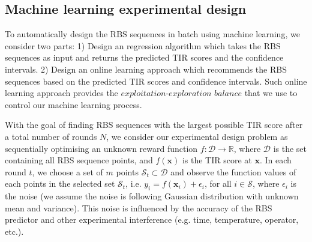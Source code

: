 \subsection{Machine learning experimental design}

To automatically design the RBS sequences in batch using machine learning, we consider two parts: 
1) Design an regression algorithm which takes the RBS sequences as input and returns the predicted TIR scores and the confidence intervals. 
2) Design an online learning approach which recommends the RBS sequences based on the predicted TIR scores and confidence intervals. 
Such online learning approach provides the $\textit{exploitation-exploration balance}$ that we use to control our machine learning process.

With the goal of finding RBS sequences with the largest possible TIR score after a total number of rounds $N$,  we consider our experimental design problem as sequentially optimising an unknown reward function $f: \mathcal{D} \rightarrow \mathbb{R}$, where $\mathcal{D}$ is the set containing all RBS sequence points, and $f(\mathbf{x})$ is the TIR score at $\mathbf{x}$. 
In each round $t$, we choose a set of $m$ points $\mathcal{S}_t \subset \mathcal{D}$ and observe the function values of each points in the selected set $\mathcal{S}_t$, i.e. $y_i = f(\mathbf{x}_i) + \epsilon_i$, for all $i \in \mathcal{S}$, where $\epsilon_i$ is the noise (we assume the noise is following Gaussian distribution with unknown mean and variance). This noise is influenced by the accuracy of the RBS predictor and other experimental interference (e.g. time, temperature, operator, etc.). 

